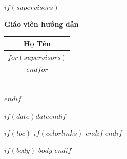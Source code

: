 \documentclass[$if(fontsize)$$fontsize$,$endif$$if(lang)$$babel-lang$,$endif$$if(papersize)$$papersize$paper,$endif$$for(classoption)$$classoption$$sep$,$endfor$]{$documentclass$}
\renewcommand{\arraystretch}{1.4}
\begin{document}
\begin{titlepage}
\begin{center}
$if(supervisors)$
\begin{minipage}{\textwidth}
\begin{center}
\large\textbf{Giáo viên hướng dẫn}\\[0.3cm]

\renewcommand{\arraystretch}{1.8}
\begin{tabular}{@{}c@{}}
\toprule
\multicolumn{1}{c}{\textbf{Họ Tên}} \\
\midrule
$for(supervisors)$
\multicolumn{1}{c}{$supervisors$} \\
$endfor$
\bottomrule
\end{tabular}
\end{center}
\end{minipage}\\[0.8cm]
$endif$

$if(date)${\large $date$}$endif$

\end{center}
\end{titlepage}

$if(toc)$
{
$if(colorlinks)$
\hypersetup{linkcolor=$if(toccolor)$$toccolor$$else$accent$endif$}
$endif$
\setcounter{tocdepth}{$toc-depth$}
\tableofcontents
}
$endif$

$if(body)$
$body$
$endif$
\end{document}

